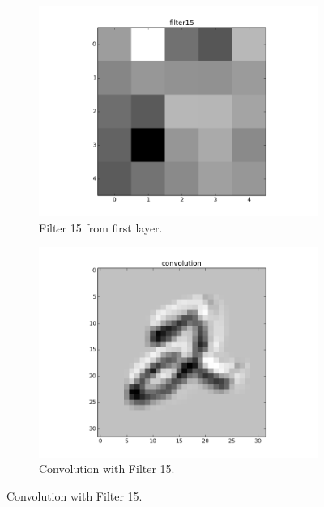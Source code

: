 \documentclass{article}
\begin{document}
\begin{figure}[h]
	\centering
	\begin{subfigure}[b]{0.45\textwidth} 
		\includegraphics[width=\textwidth]{graphics/filt1.png}
		\caption{Filter 15 from first layer.}
		\label{fig6}
	\end{subfigure}
	\begin{subfigure}[b]{0.45\textwidth} 
		\includegraphics[width=\textwidth]{graphics/conv1.png}
		\caption{Convolution with Filter 15.}
		\label{fig7}
	\end{subfigure}
\end{figure}
\end{document}
